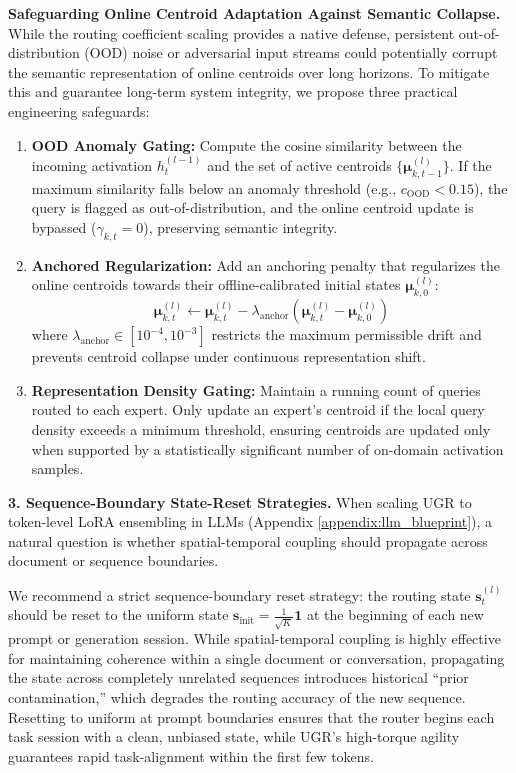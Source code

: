 \documentclass{article}
\theoremstyle{plain}
\theoremstyle{definition}
\theoremstyle{remark}
\begin{document}
\textbf{Safeguarding Online Centroid Adaptation Against Semantic Collapse.} While the routing coefficient scaling provides a native defense, persistent out-of-distribution (OOD) noise or adversarial input streams could potentially corrupt the semantic representation of online centroids over long horizons. To mitigate this and guarantee long-term system integrity, we propose three practical engineering safeguards:
\begin{enumerate}
    \item \textbf{OOD Anomaly Gating:} Compute the cosine similarity between the incoming activation $h_t^{(l-1)}$ and the set of active centroids $\{\boldsymbol{\mu}_{k, t-1}^{(l)}\}$. If the maximum similarity falls below an anomaly threshold (e.g., $c_{\text{OOD}} < 0.15$), the query is flagged as out-of-distribution, and the online centroid update is bypassed ($\gamma_{k, t} = 0$), preserving semantic integrity.
    \item \textbf{Anchored Regularization:} Add an anchoring penalty that regularizes the online centroids towards their offline-calibrated initial states $\boldsymbol{\mu}_{k, 0}^{(l)}$:
    \begin{equation}
    \boldsymbol{\mu}_{k, t}^{(l)} \leftarrow \boldsymbol{\mu}_{k, t}^{(l)} - \lambda_{\text{anchor}} \left(\boldsymbol{\mu}_{k, t}^{(l)} - \boldsymbol{\mu}_{k, 0}^{(l)}\right)
    \end{equation}
    where $\lambda_{\text{anchor}} \in [10^{-4}, 10^{-3}]$ restricts the maximum permissible drift and prevents centroid collapse under continuous representation shift.
    \item \textbf{Representation Density Gating:} Maintain a running count of queries routed to each expert. Only update an expert's centroid if the local query density exceeds a minimum threshold, ensuring centroids are updated only when supported by a statistically significant number of on-domain activation samples.
\end{enumerate}

\textbf{3. Sequence-Boundary State-Reset Strategies.}
When scaling UGR to token-level LoRA ensembling in LLMs (Appendix \ref{appendix:llm_blueprint}), a natural question is whether spatial-temporal coupling should propagate across document or sequence boundaries. 

We recommend a strict sequence-boundary reset strategy: the routing state $\mathbf{s}_t^{(l)}$ should be reset to the uniform state $\mathbf{s}_{\text{init}} = \frac{1}{\sqrt{K}}\mathbf{1}$ at the beginning of each new prompt or generation session. While spatial-temporal coupling is highly effective for maintaining coherence within a single document or conversation, propagating the state across completely unrelated sequences introduces historical ``prior contamination,'' which degrades the routing accuracy of the new sequence. Resetting to uniform at prompt boundaries ensures that the router begins each task session with a clean, unbiased state, while UGR's high-torque agility guarantees rapid task-alignment within the first few tokens.
\end{document}

